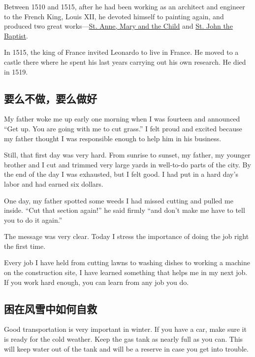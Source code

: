 Between 1510 and 1515, after he had been working
as an architect and engineer to the French King, Louis
XII, he devoted himself to painting again, and 
produced two great works—\ul{St. Anne, Mary and the Child} and \ul{St. John the Baptist}.

In 1515, the king of France invited Leonardo to live in
France. He moved to a castle there where he spent his last
years carrying out his own research. He died in 1519.

\subsection{要么不做，要么做好}
\begin{margintable}\vspace{-2cm}\footnotesize
\end{margintable}
My father woke me up early one morning when I was
fourteen and announced “Get up. You are going with me
to cut grass.” I felt proud and excited because my
father thought I was responsible enough to help him in his
business.

Still, that first day was very hard. From sunrise to sunset, my
father, my younger brother and I cut and trimmed very
large yards in well-to-do parts of the city. By
the end of the day I was exhausted, but I felt good. I had
put in a hard day's labor and had earned six dollars.

One day, my father spotted some weeds I had
missed cutting and pulled me inside. “Cut that section
again!” he said firmly “and don't make me have to tell you to do it again.”

The message was very clear. Today I stress the importance
of doing the job right the first time.

Every job I have held from cutting lawns to washing dishes
to working a machine on the construction site, I have
learned something that helps me in my next job. If
you work hard enough, you can learn from any job you
do.
\subsection{困在风雪中如何自救}
\begin{margintable}\vspace{-2cm}\footnotesize
\end{margintable}
Good transportation is very important in winter. If you
have a car, make sure it is ready for the cold weather.
Keep the gas tank as nearly full as you can. This will keep
water out of the tank and will be a reserve in case you get
into trouble.

